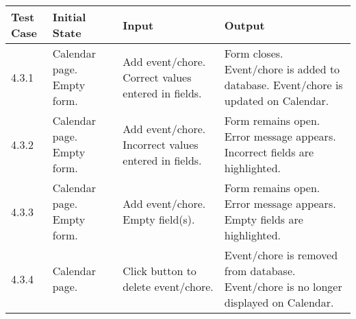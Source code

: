 \documentclass[12pt]{article}
\begin{document}
\begin{longtable}{|p{2cm}|p{3cm}|p{5cm}|p{5cm}|}
\hline
\textbf{Test Case}  & \textbf{Initial State} & \textbf{Input} & \textbf{Output} \\ \hline
4.3.1 & Calendar page. Empty form. & Add event/chore. Correct values entered in fields. & Form closes. Event/chore is added to database. Event/chore is updated on Calendar. \\ 
\hline
4.3.2 & Calendar page. Empty form. & Add event/chore. Incorrect values entered in fields. & Form remains open. Error message appears. Incorrect fields are highlighted. \\
\hline
4.3.3 & Calendar page. Empty form. & Add event/chore. Empty field(s). & Form remains open. Error message appears. Empty fields are highlighted. \\
\hline
4.3.4 & Calendar page. & Click button to delete event/chore.  & Event/chore is removed from database. Event/chore is no longer displayed on Calendar. \\
\hline
\end{longtable}
\end{document}
